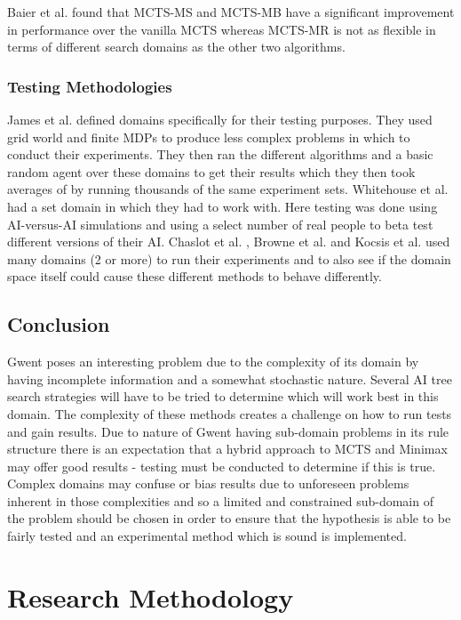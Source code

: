 \documentclass [11pt]{article}
\begin{document}
	\noindent Baier et al. \cite{hybrids} found that MCTS-MS and MCTS-MB have a significant improvement in performance over the vanilla MCTS whereas MCTS-MR is not as flexible in terms of different search domains as the other two algorithms. 
	
	\subsubsection{Testing Methodologies}
	\label{testing}
	James et al. \cite{wits} defined domains specifically for their testing purposes. They used grid world and finite MDPs to produce less complex problems in which to conduct their experiments. They then ran the different algorithms and a basic random agent over these domains to get their results which they then took averages of by running thousands of the same experiment sets.  Whitehouse et al. \cite{knowledge} had a set domain in which they had to work with. Here testing was done using AI-versus-AI simulations and using a select number of real people to beta test different versions of their AI. Chaslot et al. \cite{progressive}, Browne et al. \cite{survey} and Kocsis et al. \cite{bandit} used many domains (2 or more) to run their experiments and to also see if the domain space itself could cause these different methods to behave differently.\\
	
	\subsection{Conclusion}
	Gwent poses an interesting problem due to the complexity of its domain by having incomplete information and a somewhat stochastic nature. Several AI tree search strategies will have to be tried to determine which will work best in this domain. The complexity of these methods creates a challenge on how to run tests and gain results. Due to nature of Gwent having sub-domain problems in its rule structure there is an expectation that a hybrid approach to MCTS and Minimax may offer good results - testing must be conducted to determine if this is true. Complex domains may confuse or bias results due to unforeseen problems inherent in those complexities and so a limited and constrained sub-domain of the problem should be chosen in order to ensure that the hypothesis is able to be fairly tested and an experimental method which is sound is implemented.
	
	\section{Research Methodology}
\end{document}
